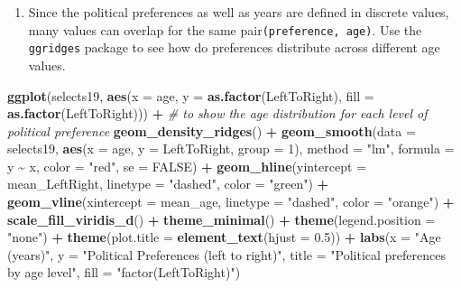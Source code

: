 \documentclass[
]{book}
\newenvironment{Shaded}{\begin{snugshade}}{\end{snugshade}}
\newcommand{\AttributeTok}[1]{\textcolor[rgb]{0.13,0.29,0.53}{#1}}
\newcommand{\CommentTok}[1]{\textcolor[rgb]{0.56,0.35,0.01}{\textit{#1}}}
\newcommand{\ConstantTok}[1]{\textcolor[rgb]{0.56,0.35,0.01}{#1}}
\newcommand{\DecValTok}[1]{\textcolor[rgb]{0.00,0.00,0.81}{#1}}
\newcommand{\FloatTok}[1]{\textcolor[rgb]{0.00,0.00,0.81}{#1}}
\newcommand{\FunctionTok}[1]{\textcolor[rgb]{0.13,0.29,0.53}{\textbf{#1}}}
\newcommand{\NormalTok}[1]{#1}
\newcommand{\SpecialCharTok}[1]{\textcolor[rgb]{0.81,0.36,0.00}{\textbf{#1}}}
\newcommand{\StringTok}[1]{\textcolor[rgb]{0.31,0.60,0.02}{#1}}
\providecommand{\tightlist}{%
  \setlength{\itemsep}{0pt}\setlength{\parskip}{0pt}}
\begin{document}
\begin{enumerate}
\def\labelenumi{\arabic{enumi}.}
\setcounter{enumi}{1}
\tightlist
\item
  Since the political preferences as well as years are defined in discrete values, many values can overlap for the same pair\texttt{(preference,\ age)}. Use the \texttt{ggridges} package to see how do preferences distribute across different age values.
\end{enumerate}

\begin{Shaded}
\begin{Highlighting}[]
\FunctionTok{ggplot}\NormalTok{(selects19, }\FunctionTok{aes}\NormalTok{(}\AttributeTok{x =}\NormalTok{ age, }\AttributeTok{y =} \FunctionTok{as.factor}\NormalTok{(LeftToRight), }\AttributeTok{fill =} \FunctionTok{as.factor}\NormalTok{(LeftToRight))) }\SpecialCharTok{+}
  \CommentTok{\# to show the age distribution for each level of political preference}
  \FunctionTok{geom\_density\_ridges}\NormalTok{() }\SpecialCharTok{+} 
  \FunctionTok{geom\_smooth}\NormalTok{(}\AttributeTok{data =}\NormalTok{ selects19, }\FunctionTok{aes}\NormalTok{(}\AttributeTok{x =}\NormalTok{ age, }\AttributeTok{y =}\NormalTok{ LeftToRight, }\AttributeTok{group =} \DecValTok{1}\NormalTok{), }
              \AttributeTok{method =} \StringTok{"lm"}\NormalTok{, }\AttributeTok{formula =}\NormalTok{ y }\SpecialCharTok{\textasciitilde{}}\NormalTok{ x, }\AttributeTok{color =} \StringTok{"red"}\NormalTok{, }\AttributeTok{se =} \ConstantTok{FALSE}\NormalTok{) }\SpecialCharTok{+}
  \FunctionTok{geom\_hline}\NormalTok{(}\AttributeTok{yintercept =}\NormalTok{ mean\_LeftRight, }\AttributeTok{linetype =} \StringTok{"dashed"}\NormalTok{, }\AttributeTok{color =} \StringTok{"green"}\NormalTok{) }\SpecialCharTok{+}
  \FunctionTok{geom\_vline}\NormalTok{(}\AttributeTok{xintercept =}\NormalTok{ mean\_age, }\AttributeTok{linetype =} \StringTok{"dashed"}\NormalTok{, }\AttributeTok{color =} \StringTok{"orange"}\NormalTok{) }\SpecialCharTok{+}
  \FunctionTok{scale\_fill\_viridis\_d}\NormalTok{() }\SpecialCharTok{+}
  \FunctionTok{theme\_minimal}\NormalTok{() }\SpecialCharTok{+}
  \FunctionTok{theme}\NormalTok{(}\AttributeTok{legend.position =} \StringTok{"none"}\NormalTok{) }\SpecialCharTok{+}
  \FunctionTok{theme}\NormalTok{(}\AttributeTok{plot.title =} \FunctionTok{element\_text}\NormalTok{(}\AttributeTok{hjust =} \FloatTok{0.5}\NormalTok{)) }\SpecialCharTok{+}
  \FunctionTok{labs}\NormalTok{(}\AttributeTok{x =} \StringTok{"Age (years)"}\NormalTok{,}
       \AttributeTok{y =} \StringTok{"Political Preferences (left to right)"}\NormalTok{,}
       \AttributeTok{title =} \StringTok{"Political preferences by age level"}\NormalTok{,}
       \AttributeTok{fill =} \StringTok{"factor(LeftToRight)"}\NormalTok{)}
\end{Highlighting}
\end{Shaded}
\end{document}
